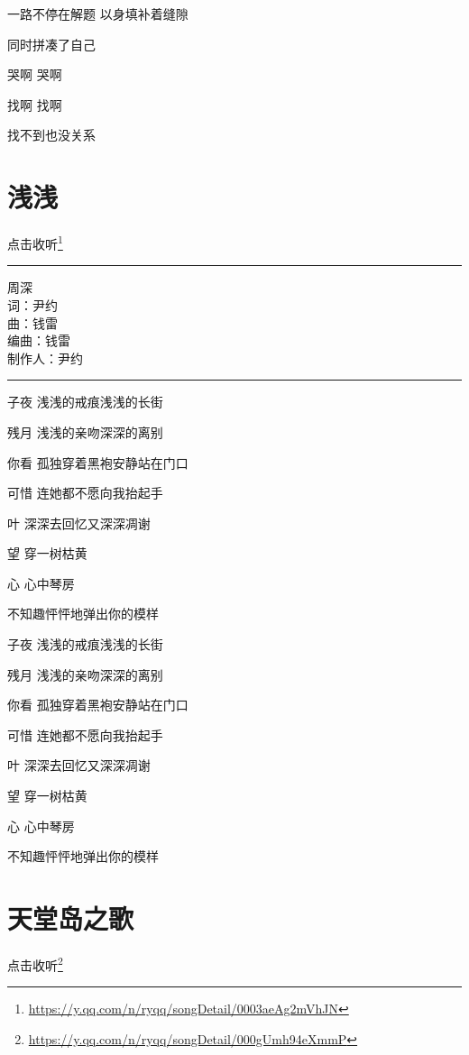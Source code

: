 \documentclass[]{ctexbook}
\renewcommand{\href}[2]{#2\footnote{\url{#1}}}
\begin{document}
一路不停在解题 以身填补着缝隙

同时拼凑了自己

哭啊 哭啊

找啊 找啊

找不到也没关系

\section*{浅浅}\label{qianqian}


\href{https://y.qq.com/n/ryqq/songDetail/0003aeAg2mVhJN}{点击收听}

\begin{center}\rule{0.5\linewidth}{0.5pt}\end{center}

周深\\
词：尹约\\
曲：钱雷\\
编曲：钱雷\\
制作人：尹约

\begin{center}\rule{0.5\linewidth}{0.5pt}\end{center}

子夜 浅浅的戒痕浅浅的长街

残月 浅浅的亲吻深深的离别

你看 孤独穿着黑袍安静站在门口

可惜 连她都不愿向我抬起手

叶 深深去回忆又深深凋谢

望 穿一树枯黄

心 心中琴房

不知趣怦怦地弹出你的模样

子夜 浅浅的戒痕浅浅的长街

残月 浅浅的亲吻深深的离别

你看 孤独穿着黑袍安静站在门口

可惜 连她都不愿向我抬起手

叶 深深去回忆又深深凋谢

望 穿一树枯黄

心 心中琴房

不知趣怦怦地弹出你的模样

\section*{天堂岛之歌}\label{haven-song}


\href{https://y.qq.com/n/ryqq/songDetail/000gUmh94eXmmP}{点击收听}
\end{document}
